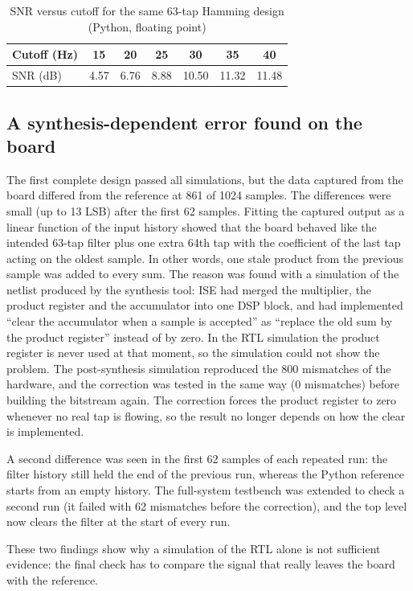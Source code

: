 \documentclass{ieeeaccess}
\begin{document}
\begin{table}[!t]
\caption{SNR versus cutoff for the same 63-tap Hamming design (Python, floating point)}
\label{tab:sweep}
\centering
\begin{tabular}{lcccccc}
\toprule
Cutoff (Hz) & 15 & 20 & 25 & 30 & 35 & 40 \\
\midrule
SNR (dB) & 4.57 & 6.76 & 8.88 & 10.50 & 11.32 & 11.48 \\
\bottomrule
\end{tabular}
\end{table}

\subsection{A synthesis-dependent error found on the board}
The first complete design passed all simulations, but the data captured from the board differed from the reference at 861 of 1024 samples. The differences were small (up to 13 LSB) after the first 62 samples. Fitting the captured output as a linear function of the input history showed that the board behaved like the intended 63-tap filter plus one extra 64th tap with the coefficient of the last tap acting on the oldest sample. In other words, one stale product from the previous sample was added to every sum. The reason was found with a simulation of the netlist produced by the synthesis tool: ISE had merged the multiplier, the product register and the accumulator into one DSP block, and had implemented ``clear the accumulator when a sample is accepted'' as ``replace the old sum by the product register'' instead of by zero. In the RTL simulation the product register is never used at that moment, so the simulation could not show the problem. The post-synthesis simulation reproduced the 800 mismatches of the hardware, and the correction was tested in the same way (0 mismatches) before building the bitstream again. The correction forces the product register to zero whenever no real tap is flowing, so the result no longer depends on how the clear is implemented.

A second difference was seen in the first 62 samples of each repeated run: the filter history still held the end of the previous run, whereas the Python reference starts from an empty history. The full-system testbench was extended to check a second run (it failed with 62 mismatches before the correction), and the top level now clears the filter at the start of every run.

These two findings show why a simulation of the RTL alone is not sufficient evidence: the final check has to compare the signal that really leaves the board with the reference.
\end{document}
